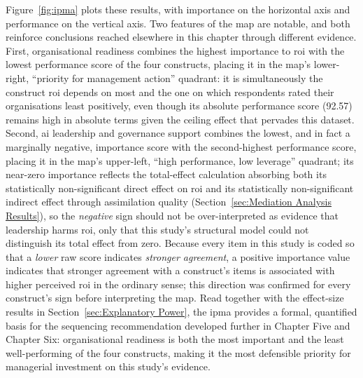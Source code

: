 \begin{table}[htbp]
	\centering
	\caption{Importance-performance map analysis (target construct: \gls{roi})}
	\label{tab:ipma}
\end{table}

Figure~\ref{fig:ipma} plots these results, with importance on the horizontal axis and performance on the vertical axis. Two features of the map are notable, and both reinforce conclusions reached elsewhere in this chapter through different evidence. First, organisational readiness combines the highest importance to \gls{roi} with the lowest performance score of the four constructs, placing it in the map's lower-right, ``priority for management action'' quadrant: it is simultaneously the construct \gls{roi} depends on most and the one on which respondents rated their organisations least positively, even though its absolute performance score (92.57) remains high in absolute terms given the ceiling effect that pervades this dataset. Second, \gls{ai} leadership and governance support combines the lowest, and in fact a marginally negative, importance score with the second-highest performance score, placing it in the map's upper-left, ``high performance, low leverage'' quadrant; its near-zero importance reflects the total-effect calculation absorbing both its statistically non-significant direct effect on \gls{roi} and its statistically non-significant indirect effect through assimilation quality (Section~\ref{sec:Mediation Analysis Results}), so the \emph{negative} sign should not be over-interpreted as evidence that leadership harms \gls{roi}, only that this study's structural model could not distinguish its total effect from zero. Because every item in this study is coded so that a \emph{lower} raw score indicates \emph{stronger agreement}, a positive importance value indicates that stronger agreement with a construct's items is associated with higher perceived \gls{roi} in the ordinary sense; this direction was confirmed for every construct's sign before interpreting the map. Read together with the effect-size results in Section~\ref{sec:Explanatory Power}, the \gls{ipma} provides a formal, quantified basis for the sequencing recommendation developed further in Chapter Five and Chapter Six: organisational readiness is both the most important and the least well-performing of the four constructs, making it the most defensible priority for managerial investment on this study's evidence.

